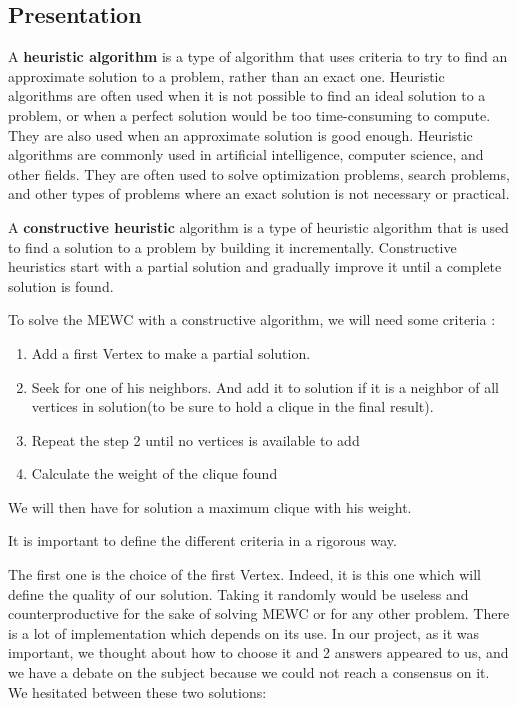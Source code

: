 
\subsection{Presentation}

A \textbf{heuristic algorithm} is a type of algorithm that uses criteria to try to find an approximate solution to a problem, rather than an exact one. Heuristic algorithms are often used when it is not possible to find an ideal solution to a problem, or when a perfect solution would be too time-consuming to compute. They are also used when an approximate solution is good enough. Heuristic algorithms are commonly used in artificial intelligence, computer science, and other fields. They are often used to solve optimization problems, search problems, and other types of problems where an exact solution is not necessary or practical.
\bigskip

A \textbf{constructive heuristic} algorithm is a type of heuristic algorithm that is used to find a solution to a problem by building it incrementally. Constructive heuristics start with a partial solution and gradually improve it until a complete solution is found.
\bigskip

To solve the MEWC with a constructive algorithm, we will need some criteria :

\begin{enumerate}
    \item Add a first Vertex to make a partial solution.
    \item Seek for one of his neighbors. And add it to solution if it is a neighbor of all vertices in solution(to be sure to hold a clique in the final result).
    \item Repeat the step 2 until no vertices is available to add
    \item Calculate the weight of the clique found
\end{enumerate}

We will then have for solution a maximum clique with his weight.
\bigskip

It is important to define the different criteria in a rigorous way.
\bigskip

The first one is the choice of the first Vertex. Indeed, it is this one which will define the quality of our solution. Taking it randomly would be useless and counterproductive for the sake of solving MEWC or for any other problem. There is a lot of implementation which depends on its use. In our project, as it was important, we thought about how to choose it and 2 answers appeared to us, and we have a debate on the subject because we could not reach a consensus on it. We hesitated between these two solutions:


